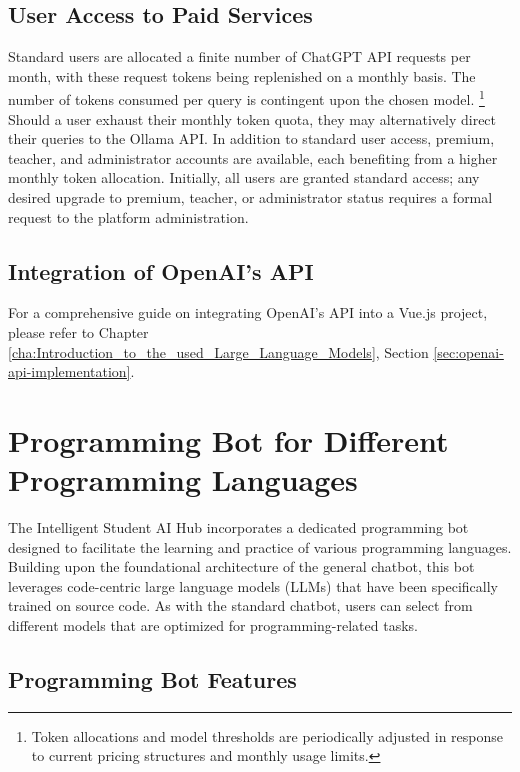 \subsection{User Access to Paid Services}

Standard users are allocated a finite number of ChatGPT API requests per month, with these request tokens being replenished on a monthly basis. The number of tokens consumed per query is contingent upon the chosen model.
\footnote{Token allocations and model thresholds are periodically adjusted in response to current pricing structures and monthly usage limits.} 
Should a user exhaust their monthly token quota, they may alternatively direct their queries to the Ollama API. In addition to standard user access, premium, teacher, and administrator accounts are available, each benefiting from a higher monthly token allocation. Initially, all users are granted standard access; any desired upgrade to premium, teacher, or administrator status requires a formal request to the platform administration.

\subsection{Integration of OpenAI's API}

For a comprehensive guide on integrating OpenAI's API into a Vue.js project, please refer to Chapter \ref{cha:Introduction_to_the_used_Large_Language_Models}, Section \ref{sec:openai-api-implementation}.




\section{Programming Bot for Different Programming Languages}

The Intelligent Student AI Hub incorporates a dedicated programming bot designed to facilitate the learning and practice of various programming languages. Building upon the foundational architecture of the general chatbot, this bot leverages code-centric large language models (LLMs) that have been specifically trained on source code. As with the standard chatbot, users can select from different models that are optimized for programming-related tasks.

\subsection{Programming Bot Features}

